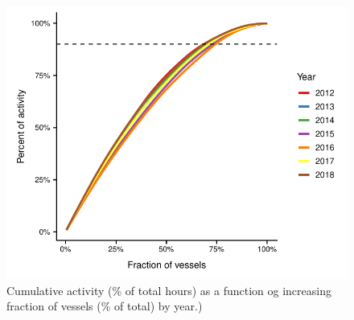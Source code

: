 \documentclass[9p,twocolumn,twoside,lineno]{pnas-new}
\begin{document}
\begin{figure}[H]
\centering
\includegraphics{img/nvessels_to_90.pdf}
\caption{\label{fig:nvessels_to_90}Cumulative activity (\% of total hours) as a function og increasing fraction of vessels (\% of total) by year.)}
\end{figure}



\end{document}
